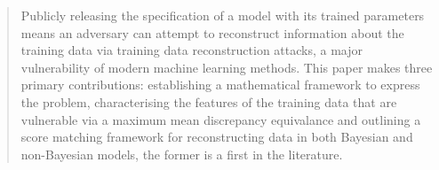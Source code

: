 \documentclass[hyperref]{article}
\theoremstyle{plain}
\theoremstyle{remark}
\begin{document}
\twocolumn[
\icmltitle{On Reconstructing Training Data From Bayesian Posteriors and Trained Models}



\icmlsetsymbol{equal}{*}

\begin{icmlauthorlist}
\icmlauthor{George Wynne}{yyy}
\end{icmlauthorlist}

\icmlaffiliation{yyy}{Alan Turing Institute}

\icmlcorrespondingauthor{}{gwynne23@turing.ac.uk}

\icmlkeywords{Machine Learning, ICML}

\vskip 0.3in
]


\printAffiliationsAndNotice{}  %

\begin{abstract}
Publicly releasing the specification of a model with its trained parameters means an adversary can attempt to reconstruct information about the training data via training data reconstruction attacks, a major vulnerability of modern machine learning methods. This paper makes three primary contributions: establishing a mathematical framework to express the problem, characterising the features of the training data that are vulnerable via a maximum mean discrepancy equivalance and outlining a score matching framework for reconstructing data in both Bayesian and non-Bayesian models, the former is a first in the literature. 
\end{abstract}
\end{document}
